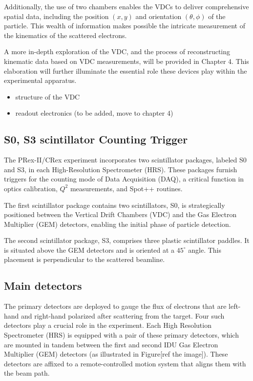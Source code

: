 Additionally, the use of two chambers enables the VDCs to deliver comprehensive spatial data, including the position $(x,y)$ and orientation $(\theta, \phi)$ of the particle. This wealth of information makes possible the intricate measurement of the kinematics of the scattered electrons.

A more in-depth exploration of the VDC, and the process of reconstructing kinematic data based on VDC measurements, will be provided in Chapter 4. This elaboration will further illuminate the essential role these devices play within the experimental apparatus.

\begin{itemize}
    \item structure of the VDC 
    \item readout electronics (to be added, move to chapter 4)
\end{itemize}

\subsection{S0, S3 scintillator Counting Trigger}

The PRex-II/CRex experiment incorporates two scintillator packages, labeled S0 and S3, in each High-Resolution Spectrometer (HRS). These packages furnish triggers for the counting mode of Data Acquisition (DAQ), a critical function in optics calibration, $Q^2$ measurements, and Spot++ routines.

The first scintillator package contains two scintillators, S0, is strategically positioned between the Vertical Drift Chambers (VDC) and the Gas Electron Multiplier (GEM) detectors, enabling the initial phase of particle detection.

The second scintillator package, S3, comprises three plastic scintillator paddles. It is situated above the GEM detectors and is oriented at a $45^\circ$ angle. This placement is perpendicular to the scattered beamline. 


\subsection{Main detectors}

The primary detectors are deployed to gauge the flux of electrons that are left-hand and right-hand polarized after scattering from the target. Four such detectors play a crucial role in the experiment. Each High Resolution Spectrometer (HRS) is equipped with a pair of these primary detectors, which are mounted in tandem between the first and second IDU Gas Electron Multiplier (GEM) detectors (as illustrated in Figure[ref the image]). These detectors are affixed to a remote-controlled motion system that aligns them with the beam path.

